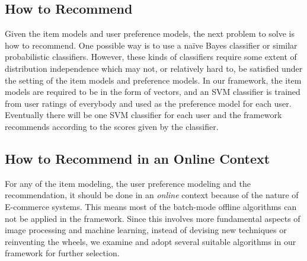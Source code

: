 \subsection{How to Recommend}
Given the item models and user preference models, the next problem to solve is how to recommend.
One possible way is to use a na\"ive Bayes classifier or similar probabilistic classifiers.
However, these kinds of classifiers require some extent of distribution independence which may not, 
  or relatively hard to, be satisfied under the setting of the item models and preference models. 
In our framework, the item models are required to be in the form of vectors, and an SVM classifier 
  is trained from user ratings of everybody and used as the preference model for each user.
Eventually there will be one SVM classifier for each user and the framework recommends according to
  the scores given by the classifier. 

\subsection{How to Recommend in an Online Context}
For any of the item modeling, the user preference modeling and the recommendation, 
  it should be done in an \emph{online} context because of the nature of E-commerce systems.
This means most of the batch-mode offline algorithms can not be applied in the framework.
Since this involves more fundamental aspects of image processing and machine learning, 
  instead of devising new techniques or reinventing the wheels, we examine and adopt several 
  suitable algorithms in our framework for further selection. 
